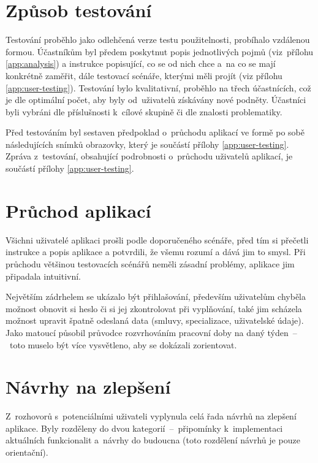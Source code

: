 \documentclass[twoside]{ctuthesis}
\begin{document}
\section{Způsob testování}
Testování proběhlo jako odlehčená verze testu použitelnosti, probíhalo vzdálenou formou. Účastníkům byl předem poskytnut popis jednotlivých pojmů (viz~přílohu \ref{app:analysis}) a instrukce popisující, co se od nich chce a~na co se mají konkrétně zaměřit, dále testovací scénáře, kterými měli projít (viz přílohu \ref{app:user-testing}). Testování bylo kvalitativní, proběhlo na třech účastnících, což je dle \cite{nielsen2000why} optimální počet, aby byly od~uživatelů získávány nové podněty. Účastníci byli vybráni dle příslušnosti k~cílové skupině či dle znalosti problematiky.

Před testováním byl sestaven předpoklad o~průchodu aplikací ve formě po sobě následujících snímků obrazovky, který je součástí přílohy \ref{app:user-testing}. Zpráva z~testování, obsahující podrobnosti o~průchodu uživatelů aplikací, je součástí přílohy \ref{app:user-testing}.

\section{Průchod aplikací}
Všichni uživatelé aplikaci prošli podle doporučeného scénáře, před tím si přečetli instrukce a popis aplikace a potvrdili, že všemu rozumí a dává jim to smysl. Při průchodu většinou testovacích scénářů neměli zásadní problémy, aplikace jim připadala intuitivní.

Největším zádrhelem se ukázalo být přihlašování, především uživatelům chyběla možnost obnovit si heslo či si jej zkontrolovat při vyplňování, také jim scházela možnost upravit špatně odeslaná data (smluvy, specializace, uživatelské údaje). Jako matoucí působil průvodce rozvrhováním pracovní doby na daný týden~–~toto muselo být více vysvětleno, aby se dokázali zorientovat.

\section{Návrhy na zlepšení}
Z~rozhovorů s~potenciálními uživateli vyplynula celá řada návrhů na zlepšení aplikace. Byly rozděleny do dvou kategorií~–~připomínky k~implementaci aktuálních funkcionalit a~návrhy do budoucna (toto rozdělení návrhů je pouze orientační).
\end{document}
